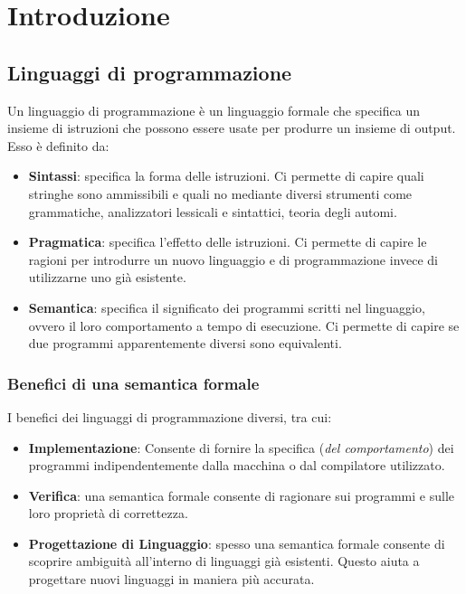 \chapter{Introduzione}
\section{Linguaggi di programmazione}
Un linguaggio di programmazione è un linguaggio formale che specifica un
insieme di istruzioni che possono essere usate per produrre un insieme di
output.
Esso è definito da:
\begin{itemize}
    \item \textbf{Sintassi}: specifica la forma delle istruzioni. Ci permette di
    capire quali stringhe sono ammissibili e quali no mediante diversi strumenti come 
    grammatiche, analizzatori lessicali e sintattici, teoria degli automi.
    \item \textbf{Pragmatica}: specifica l'effetto delle istruzioni. Ci permette
    di capire le ragioni per introdurre un nuovo linguaggio e di programmazione 
    invece di utilizzarne uno già esistente.
    \item \textbf{Semantica}: specifica il significato dei programmi scritti nel linguaggio, ovvero il loro 
    comportamento a tempo di esecuzione. Ci permette di capire se due programmi 
    apparentemente diversi sono equivalenti.
\end{itemize}
\subsection{Benefici di una semantica formale}
I benefici dei linguaggi di programmazione diversi, tra cui:
\begin{itemize}
    \item \textbf{Implementazione}: Consente di fornire la specifica (\textit{del comportamento}) 
    dei programmi indipendentemente dalla macchina o dal compilatore utilizzato.
    \item \textbf{Verifica}: una semantica formale consente di ragionare 
    sui programmi e sulle loro proprietà di correttezza.
    \item \textbf{Progettazione di Linguaggio}: spesso una semantica formale consente di 
    scoprire ambiguità all'interno di linguaggi già esistenti. Questo aiuta a progettare 
    nuovi linguaggi in maniera più accurata.
\end{itemize}
